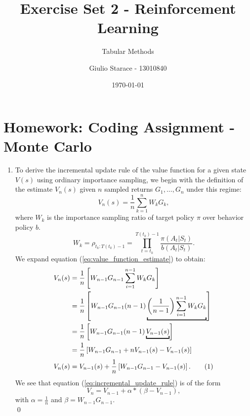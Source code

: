 \documentclass{article}
\title{Exercise Set 2 - Reinforcement Learning}
\subtitle{Tabular Methods}
\author{Giulio Starace - 13010840}
\date{\today}
\newcommand\numberthis{\addtocounter{equation}{1}\tag{\theequation}}
\begin{document}
\maketitle
\section*{Homework: Coding Assignment - Monte Carlo}
\begin{enumerate}
	\item To derive the incremental update rule of the value function for a given state $V(s)$ using
	      ordinary importance sampling, we begin with the definition of the estimate $V_n(s)$ given $n$
	      sampled returns $G_1, \dots, G_n$ under this regime:
	      \begin{equation}\label{eq:value_function_estimate}
		      V_n(s) = \frac{1}{n} \sum^n_{k=1} W_k G_k,
	      \end{equation}
	      where $W_k$ is the importance sampling ratio of target policy $\pi$ over behavior policy $b$.
	      \begin{equation}
		      W_k = \rho_{t_k:T(t_k)-1} = \prod_{t=t_k}^{T(t_k)-1} \frac{\pi(A_t|S_t)}{b(A_t|S_t)}.
	      \end{equation}
	      We expand equation (\ref{eq:value_function_estimate}) to obtain:
	      \begin{align*}
		      V_n(s) & = \frac{1}{n} \left[W_{n-1} G_{n-1} \sum^{n-1}_{i=1}W_kG_k\right]                  \\
		             & = \frac{1}{n} \left[W_{n-1} G_{n-1}
		      (n-1)\underbracket{\left(\frac{1}{n-1}\right)\sum^{n-1}_{i=1}W_kG_k}\right]                 \\
		             & =  \frac{1}{n} \left[W_{n-1} G_{n-1}(n-1)\underbracket{V_{n-1}(s)} \right]         \\
		             & = \frac{1}{n} \left[W_{n-1} G_{n-1}+ n V_{n-1}(s) - V_{n-1}(s)\right]              \\
		      V_n(s) & =  V_{n-1}(s) + \frac{1}{n} \left[W_{n-1} G_{n-1} - V_{n-1}(s)\right]. \numberthis
		      \label{eq:incremental_update_rule}
	      \end{align*}
	      We see that equation (\ref{eq:incremental_update_rule}) is of the form
	      \begin{equation}
		      V_n = V_{n-1} + \alpha * \left(\beta - V_{n-1}\right),
	      \end{equation}
	      with $\alpha = \frac{1}{n}$ and $\beta = W_{n-1} G_{n-1}$.  \\ \qed


\end{enumerate}
\end{document}

